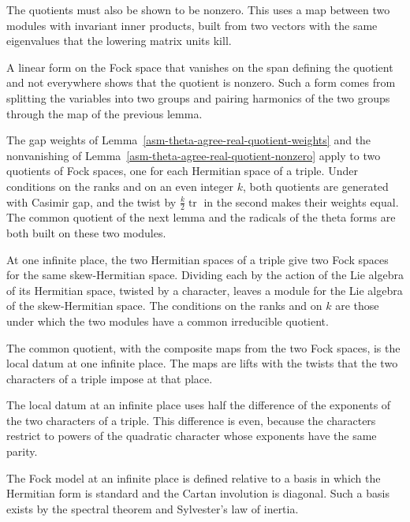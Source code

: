 The quotients must also be shown to be nonzero. This uses a map between two
modules with invariant inner products, built from two vectors with the same
eigenvalues that the lowering matrix units kill.

A linear form on the Fock space that vanishes on the span defining the quotient
and not everywhere shows that the quotient is nonzero. Such a form comes from
splitting the variables into two groups and pairing harmonics of the two groups
through the map of the previous lemma.

The gap weights of Lemma~\ref{asm-theta-agree-real-quotient-weights} and the
nonvanishing of Lemma~\ref{asm-theta-agree-real-quotient-nonzero} apply to two
quotients of Fock spaces, one for each Hermitian space of a triple. Under
conditions on the ranks and on an even integer $k$, both quotients are
generated with Casimir gap, and the twist by $\tfrac k2\operatorname{tr}$ in the
second makes their weights equal. The common quotient of the next lemma and
the radicals of the theta forms are both built on these two modules.

At one infinite place, the two Hermitian spaces of a triple give two Fock
spaces for the same skew-Hermitian space. Dividing each by the action of the
Lie algebra of its Hermitian space, twisted by a character, leaves a module for
the Lie algebra of the skew-Hermitian space. The conditions on the ranks and on
$k$ are those under which the two modules have a common irreducible quotient.

The common quotient, with the composite maps from the two Fock spaces, is the
local datum at one infinite place. The maps are lifts with the twists that the
two characters of a triple impose at that place.

The local datum at an infinite place uses half the difference of the exponents
of the two characters of a triple. This difference is even, because the
characters restrict to powers of the quadratic character whose exponents have
the same parity.

The Fock model at an infinite place is defined relative to a basis in which the
Hermitian form is standard and the Cartan involution is diagonal. Such a basis
exists by the spectral theorem and Sylvester's law of inertia.

